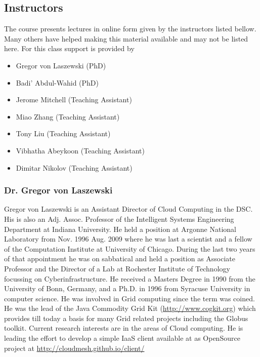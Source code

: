 \subsection{Instructors}
\label{\detokenize{i524/preface/instructors:instructors}}\label{\detokenize{i524/preface/instructors::doc}}
The course presents lectures in online form given by the instructors
listed bellow. Many others have helped making this material available
and may not be listed here. For this class support is provided by
\begin{itemize}
\item {} 
Gregor von Laszewski (PhD)

\item {} 
Badi' Abdul-Wahid (PhD)

\item {} 
Jerome Mitchell (Teaching Assistant)

\item {} 
Miao Zhang (Teaching Assistant)

\item {} 
Tony Liu (Teaching Assistant)

\item {} 
Vibhatha Abeykoon (Teaching Assistant)

\item {} 
Dimitar Nikolov (Teaching Assistant)

\end{itemize}


\subsubsection{Dr. Gregor von Laszewski}
\label{\detokenize{i524/preface/instructors:dr-gregor-von-laszewski}}
\noindent{}

Gregor von Laszewski is an Assistant Director of Cloud Computing in
the DSC. His is also an Adj. Assoc. Professor of the Intelligent
Systems Engineering Department at Indiana University. He held a
position at Argonne National Laboratory from Nov. 1996 \textendash{} Aug.  2009
where he was last a scientist and a fellow of the Computation
Institute at University of Chicago. During the last two years of that
appointment he was on sabbatical and held a position as Associate
Professor and the Director of a Lab at Rochester Institute of
Technology focussing on Cyberinfrastructure. He received a Masters
Degree in 1990 from the University of Bonn, Germany, and a Ph.D. in
1996 from Syracuse University in computer science. He was involved in
Grid computing since the term was coined. He was the lead of the Java
Commodity Grid Kit (\url{http://www.cogkit.org}) which provides till today a
basis for many Grid related projects including the Globus
toolkit. Current research interests are in the areas of Cloud
computing. He is leading the effort to develop a simple IaaS client
available at as OpenSource project at
\url{http://cloudmesh.github.io/client/}

